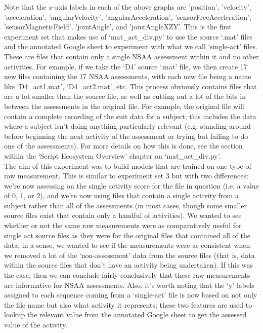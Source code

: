 \documentclass[12pt,twoside]{report}
\begin{document}
\quad  Note that the $x$-axis labels in each of the above graphs are 'position', 'velocity', 'acceleration', 'angularVelocity', 'angularAcceleration', 'sensorFreeAcceleration', 'sensorMagneticField', 'jointAngle', and 'jointAngleXZY'. This is the first experiment set that makes use of ‘mat\_act\_div.py’ to use the source ‘.mat’ files and the annotated Google sheet to experiment with what we call ‘single-act’ files. These are files that contain only a single NSAA assessment within it and no other activities. For example, if we take the ‘D4’ source ‘.mat’ file, we then create 17 new files containing the 17 NSAA assessments, with each new file being a name like ‘D4\_act1.mat’, ‘D4\_act2.mat’, etc. This process obviously contains files that are a lot smaller than the source file, as well as cutting out a lot of the bits in between the assessments in the original file. For example, the original file will contain a complete recording of the suit data for a subject; this includes the data where a subject isn’t doing anything particularly relevant (e.g. standing around before beginning the next activity of the assessment or trying but failing to do one of the assessments). For more details on how this is done, see the section within the ‘Script Ecosystem Overview’ chapter on ‘mat\_act\_div.py’.\\

\quad The aim of this experiment was to build models that are trained on one type of raw measurement. This is similar to experiment set 3 but with two differences: we’re now assessing on the single activity score for the file in question (i.e. a value of 0, 1, or 2), and we’re now using files that contain a single activity from a subject rather than all of the assessments (in most cases, though some smaller source files exist that contain only a handful of activities). We wanted to see whether or not the same raw measurements were as comparatively useful for single act source files as they were for the original files that contained all of the data; in a sense, we wanted to see if the measurements were as consistent when we removed a lot of the ‘non-assessment’ data from the source files (that is, data within the source files that don’t have an activity being undertaken). If this was the case, then we can conclude fairly conclusively that these raw measurements are informative for NSAA assessments. Also, it’s worth noting that the ‘y’ labels assigned to each sequence coming from a ‘single-act’ file is now based on not only the file name but also what activity it represents; these two features are used to lookup the relevant value from the annotated Google sheet to get the assessed value of the activity.
\end{document}
